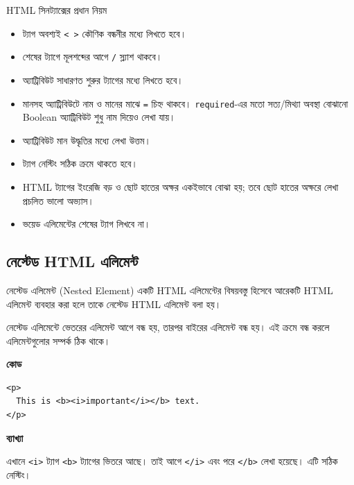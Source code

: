 \begin{keypointbox}{HTML সিনট্যাক্সের প্রধান নিয়ম}
\begin{itemize}
\item ট্যাগ অবশ্যই \texttt{< >} কৌণিক বন্ধনীর মধ্যে লিখতে হবে।
\item শেষের ট্যাগে মূলশব্দের আগে \texttt{/} স্ল্যাশ থাকবে।
\item অ্যাট্রিবিউট সাধারণত শুরুর ট্যাগের মধ্যে লিখতে হবে।
\item মানসহ অ্যাট্রিবিউটে নাম ও মানের মাঝে \texttt{=} চিহ্ন থাকবে। \texttt{required}-এর মতো সত্য/মিথ্যা অবস্থা বোঝানো Boolean অ্যাট্রিবিউট শুধু নাম দিয়েও লেখা যায়।
\item অ্যাট্রিবিউট মান উদ্ধৃতির মধ্যে লেখা উত্তম।
\item ট্যাগ নেস্টিং সঠিক ক্রমে থাকতে হবে।
\item HTML ট্যাগের ইংরেজি বড় ও ছোট হাতের অক্ষর একইভাবে বোঝা হয়; তবে ছোট হাতের অক্ষরে লেখা প্রচলিত ভালো অভ্যাস।
\item ভয়েড এলিমেন্টের শেষের ট্যাগ লিখবে না।
\end{itemize}
\end{keypointbox}

\subsection{নেস্টেড HTML এলিমেন্ট}

\begin{definitionbox}{নেস্টেড এলিমেন্ট (Nested Element)}
একটি HTML এলিমেন্টের বিষয়বস্তু হিসেবে আরেকটি HTML এলিমেন্ট ব্যবহার করা হলে তাকে নেস্টেড HTML এলিমেন্ট বলা হয়।
\end{definitionbox}

নেস্টেড এলিমেন্টে ভেতরের এলিমেন্ট আগে বন্ধ হয়, তারপর বাইরের এলিমেন্ট বন্ধ হয়। এই ক্রমে বন্ধ করলে এলিমেন্টগুলোর সম্পর্ক ঠিক থাকে।

\par\noindent
\begin{minipage}[t]{.50\linewidth}\vspace{0pt}\small
\textbf{\color{chFourTeal}কোড}\par
\begin{verbatim}
<p>
  This is <b><i>important</i></b> text.
</p>
\end{verbatim}

\par\smallskip
\end{minipage}\hfill
\begin{minipage}[t]{.46\linewidth}\vspace{0pt}\small
\textbf{\color{chFourTeal}ব্যাখ্যা}\par
এখানে \texttt{<i>} ট্যাগ \texttt{<b>} ট্যাগের ভিতরে আছে। তাই আগে \texttt{</i>} এবং পরে \texttt{</b>} লেখা হয়েছে। এটি সঠিক নেস্টিং।
\par\smallskip
\end{minipage}\par


